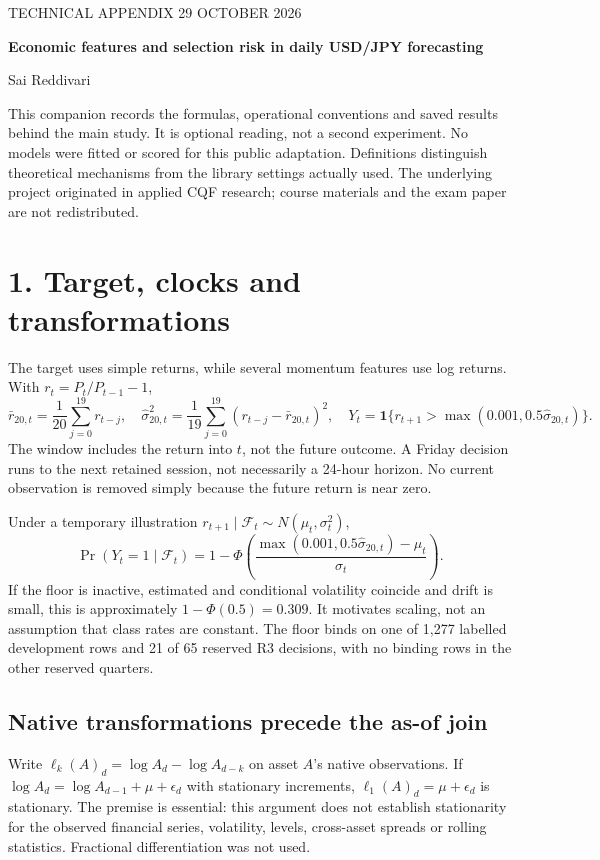 \documentclass[11pt,a4paper]{article}
\begin{document}
\thispagestyle{plain}
{\small\sffamily\color{muted}TECHNICAL APPENDIX \hfill 29 OCTOBER 2026}\par
\vspace{10pt}
{\LARGE\bfseries\color{ink}Economic features and selection risk in daily USD/JPY forecasting\par}
\vspace{8pt}Sai Reddivari\par
This companion records the formulas, operational conventions and saved results behind the main study. It is optional reading, not a second experiment. No models were fitted or scored for this public adaptation. Definitions distinguish theoretical mechanisms from the library settings actually used. The underlying project originated in applied CQF research; course materials and the exam paper are not redistributed.

\section*{1. Target, clocks and transformations}
The target uses simple returns, while several momentum features use log returns. With $r_t=P_t/P_{t-1}-1$,
\[
\bar r_{20,t}=\frac1{20}\sum_{j=0}^{19}r_{t-j},\quad
\widehat\sigma_{20,t}^2=\frac1{19}\sum_{j=0}^{19}(r_{t-j}-\bar r_{20,t})^2,\quad
Y_t=\mathbf1\{r_{t+1}>\max(0.001,0.5\widehat\sigma_{20,t})\}.
\]
The window includes the return into $t$, not the future outcome. A Friday decision runs to the next retained session, not necessarily a 24-hour horizon. No current observation is removed simply because the future return is near zero.

Under a temporary illustration $r_{t+1}\mid\mathcal F_t\sim N(\mu_t,\sigma_t^2)$,
\[
\Pr(Y_t=1\mid\mathcal F_t)=
1-\Phi\!\left(\frac{\max(0.001,0.5\widehat\sigma_{20,t})-\mu_t}{\sigma_t}\right).
\]
If the floor is inactive, estimated and conditional volatility coincide and drift is small, this is approximately $1-\Phi(0.5)=0.309$. It motivates scaling, not an assumption that class rates are constant. The floor binds on one of 1,277 labelled development rows and 21 of 65 reserved R3 decisions, with no binding rows in the other reserved quarters.

\subsection*{Native transformations precede the as-of join}
Write $\ell_k(A)_d=\log A_d-\log A_{d-k}$ on asset $A$'s native observations. If $\log A_d=\log A_{d-1}+\mu+\epsilon_d$ with stationary increments, $\ell_1(A)_d=\mu+\epsilon_d$ is stationary. The premise is essential: this argument does not establish stationarity for the observed financial series, volatility, levels, cross-asset spreads or rolling statistics. Fractional differentiation was not used.
\end{document}
